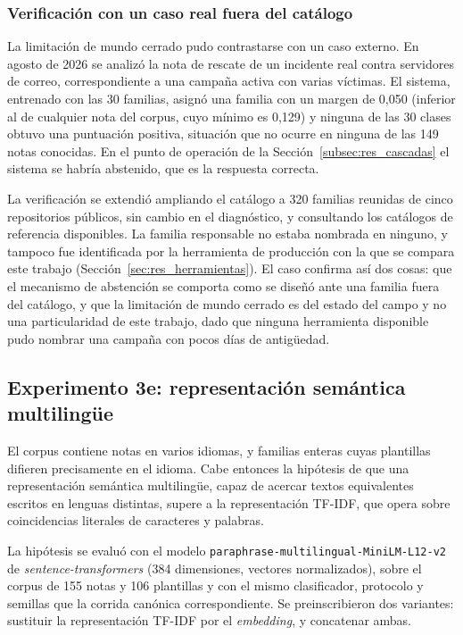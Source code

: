 \subsubsection*{Verificación con un caso real fuera del catálogo}

La limitación de mundo cerrado pudo contrastarse con un caso externo. En agosto de 2026 se analizó la nota de rescate de un incidente real contra servidores de correo, correspondiente a una campaña activa con varias víctimas. El sistema, entrenado con las 30 familias, asignó una familia con un margen de 0,050 (inferior al de cualquier nota del corpus, cuyo mínimo es 0,129) y ninguna de las 30 clases obtuvo una puntuación positiva, situación que no ocurre en ninguna de las 149 notas conocidas. En el punto de operación de la Sección~\ref{subsec:res_cascadas} el sistema se habría abstenido, que es la respuesta correcta.

La verificación se extendió ampliando el catálogo a 320 familias reunidas de cinco repositorios públicos, sin cambio en el diagnóstico, y consultando los catálogos de referencia disponibles. La familia responsable no estaba nombrada en ninguno, y tampoco fue identificada por la herramienta de producción con la que se compara este trabajo (Sección~\ref{sec:res_herramientas}). El caso confirma así dos cosas: que el mecanismo de abstención se comporta como se diseñó ante una familia fuera del catálogo, y que la limitación de mundo cerrado es del estado del campo y no una particularidad de este trabajo, dado que ninguna herramienta disponible pudo nombrar una campaña con pocos días de antigüedad.


\subsection{Experimento 3e: representación semántica multilingüe}
\label{subsec:res_embeddings}

El corpus contiene notas en varios idiomas, y familias enteras cuyas plantillas difieren precisamente en el idioma. Cabe entonces la hipótesis de que una representación semántica multilingüe, capaz de acercar textos equivalentes escritos en lenguas distintas, supere a la representación TF-IDF, que opera sobre coincidencias literales de caracteres y palabras.

La hipótesis se evaluó con el modelo \texttt{paraphrase-multilingual-MiniLM-L12-v2} de \textit{sentence-transformers} (384 dimensiones, vectores normalizados), sobre el corpus de 155 notas y 106 plantillas y con el mismo clasificador, protocolo y semillas que la corrida canónica correspondiente. Se preinscribieron dos variantes: sustituir la representación TF-IDF por el \textit{embedding}, y concatenar ambas.

